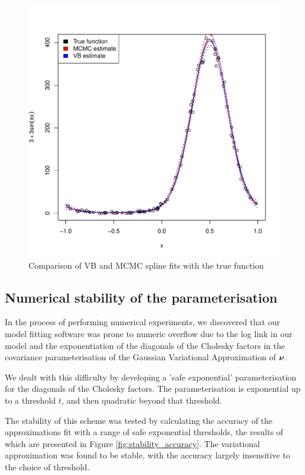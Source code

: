 \begin{figure}[h]
	\label{fig:spline}
	\caption{Comparison of VB and MCMC spline fits with the true function}
	\includegraphics[width=0.95 \textwidth]{code/results/accuracy_plots_spline_gva2.pdf}
\end{figure}
		
\subsection{Numerical stability of the parameterisation}
In the process of performing numerical experiments, we discovered that our
model fitting software was prone to numeric overflow due to the log link in our
model and the exponentiation of the diagonals of the Cholesky factors in the
covariance parameterisation of the Gaussian Variational Approximation of
${\boldsymbol \nu}$.

We dealt with this difficulty by developing a 'safe exponential'
parameterisation for the diagonals of the Cholesky factors. The
parameterisation is exponential up to a threshold $t$, and then quadratic
beyond that threshold.

The stability of this scheme was tested by calculating the accuracy of the
approximations fit with a range of safe exponential thresholds, the results of
which are presented in Figure \ref{fig:stability_accuracy}. The variational
approximation was found to be stable, with the accuracy largely insensitive to
the choice of threshold.

